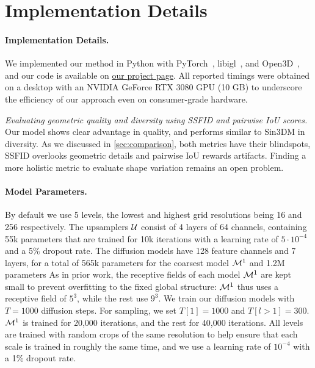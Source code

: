

\section{Implementation Details}\label{sec:implementation}
\paragraph{Implementation Details.}
We implemented our method in Python with PyTorch~\cite{paszke_pytorch_2019}, libigl~\cite{jacobson_libigl_nodate}, and Open3D~\cite{zhou2018open3d}, and our code is available on \href{https://nissmar.github.io/projects/shapeshifter/}{our project page}. All reported timings were obtained on a desktop with an NVIDIA GeForce RTX 3080 GPU (10 GB) to underscore the efficiency of our approach even on consumer-grade hardware.

\begin{table*}[t]
    \centering
    \resizebox{1.\linewidth}{!}{}
    \vspace*{-3mm}
    \caption{\emph{Evaluating geometric quality and diversity using SSFID and pairwise IoU scores.} Our model shows clear advantage in quality, and performs similar to Sin3DM in diversity. As we discussed in \cref{sec:comparison}, both metrics have their blindspots, SSFID overlooks geometric details and pairwise IoU rewards artifacts. Finding a more holistic metric to evaluate shape variation remains an open problem.  \vspace*{-2mm}} 
    \label{tab:ssfid}
\end{table*}


\paragraph{Model Parameters.}
By default we use 5 levels, the lowest and highest grid resolutions being 16 and 256 respectively.
The upsamplers \(\mathcal{U}\) consist of 4 layers of 64 channels, containing {\mytilde}55k parameters that are trained for 10k iterations with a learning rate of $5 \!\cdot\! 10^{-4}$ and a 5\% dropout rate.
The diffusion models have 128 feature channels and 7 layers, for a total of {\mytilde}565k parameters for the coarsest model $\mathcal{M}^{1}$ and 1.2M parameters As in prior work, the receptive fields of each model \(\mathcal{M}^{1}\) are kept small to prevent overfitting to the fixed global structure: \(\mathcal{M}^{1}\) thus uses a receptive field of $5^3$, while the rest use $9^3$.
We train our diffusion models with $T\!=\!1000$ diffusion steps.
For sampling, we set $T[1]\!=\!1000$ and $T[l\!>\!1]\!=\!300$. 
$\mathcal{M}^{1}$ is trained for 20,000 iterations, and the rest for 40,000 iterations. 
All levels are trained with random crops of the same resolution to help ensure that each scale is trained in roughly the same time, and we use a learning rate of $10^{-4}$ with a 1\% dropout rate.

